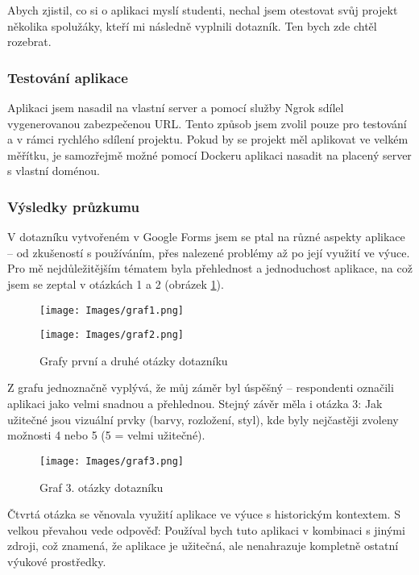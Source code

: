 Abych zjistil, co si o aplikaci myslí studenti, nechal jsem otestovat svůj projekt několika spolužáky, kteří mi následně vyplnili dotazník. Ten bych zde chtěl rozebrat.

\subsubsection{Testování aplikace}
Aplikaci jsem nasadil na vlastní server a pomocí služby Ngrok\cite{ngrok} sdílel vygenerovanou zabezpečenou URL. Tento způsob jsem zvolil pouze pro testování a v rámci rychlého sdílení projektu. Pokud by se projekt měl aplikovat ve velkém měřítku, je samozřejmě možné pomocí Dockeru aplikaci nasadit na placený server s vlastní doménou.


\subsubsection{Výsledky průzkumu}
V dotazníku vytvořeném v Google Forms jsem se ptal na různé aspekty aplikace – od zkušeností s používáním, přes nalezené problémy až po její využití ve výuce.
Pro mě nejdůležitějším tématem byla přehlednost a jednoduchost aplikace, na což jsem se zeptal v otázkách 1 a 2 (obrázek \ref{fig:graf12}).

\begin{figure}[h]
\begin{minipage}[]{0.5\linewidth}
\texttt{[image: Images/graf1.png]}
\end{minipage}
\hfill
\begin{minipage}[]{0.5\linewidth}
\texttt{[image: Images/graf2.png]}
\end{minipage}%
\caption{Grafy první a druhé otázky dotazníku}
\label{fig:graf12}
\end{figure}

Z grafu jednoznačně vyplývá, že můj záměr byl úspěšný – respondenti označili aplikaci jako velmi snadnou a přehlednou. Stejný závěr měla i otázka 3: Jak užitečné jsou vizuální prvky (barvy, rozložení, styl), kde byly nejčastěji zvoleny možnosti 4 nebo 5 (5 = velmi užitečné).

\begin{figure}[h]
    \centering
    \texttt{[image: Images/graf3.png]}
    \caption{Graf 3. otázky dotazníku}
    \label{fig:graf3}
\end{figure}

\newpage
Čtvrtá otázka se věnovala využití aplikace ve výuce s historickým kontextem. S velkou převahou vede odpověď: Používal bych tuto aplikaci v kombinaci s jinými zdroji, což znamená, že aplikace je užitečná, ale nenahrazuje kompletně ostatní výukové prostředky.

